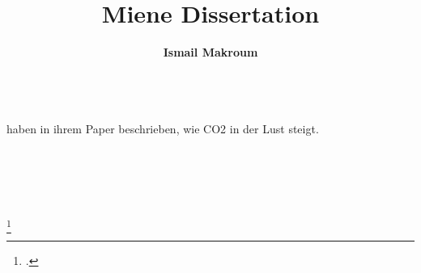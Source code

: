 \documentclass[ngerman,12pt]{scrartcl}
\author{\textbf{ Ismail Makroum}}
\title{Miene Dissertation}
\begin{document}
\maketitle

\tableofcontents



\blindtext\\

\citeauthor{amt-14-2717-2021}  haben in ihrem Paper \cite{amt-14-2717-2021}  \citeyear{amt-14-2717-2021} beschrieben, wie CO2 in der Lust steigt. \\

\cite{amt-14-2717-2021}\\

\cite{knuth:1984}\\

\cite{makroum:2022} \\

\cite{ziegenhagen:2017}\\


\parencite{knuth:1984}\\

\footcite{knuth:1984}\\






\printbibliography[type=article, title={Genutzte Artikel}]

\printbibliography[type=book, title={Genutzte Bücher}]

\printbibliography
\end{document}
